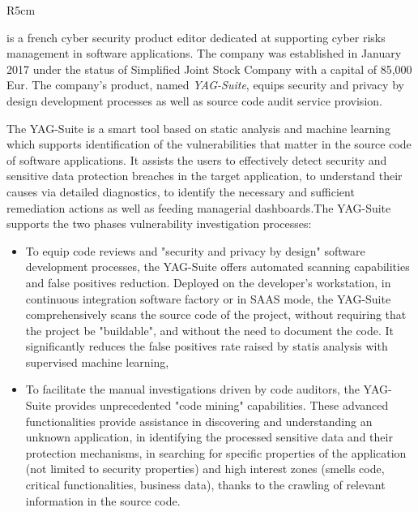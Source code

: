 \documentclass[a4paper,11pt]{article}
\begin{document}
\pagebreak
{}


\begin{wrapfigure}{R}{5cm}
\vspace{-1.3cm}
\hfill {}
\vspace{-0.8cm}
\end{wrapfigure}
\label{sec:participantYAG}

\YAGlong{} is a french cyber security product editor dedicated at supporting cyber risks management in software applications. The company was established in January 2017 under the status of Simplified Joint Stock Company with a capital of 85,000 Eur. The company's product, named \textit{YAG-Suite}, equips security and privacy by design development processes as well as source code audit service provision. 

The YAG-Suite is a smart tool based on static analysis and machine learning which supports identification of the vulnerabilities that matter in the source code of software applications. It assists the users to effectively detect security and sensitive data protection breaches in the target application, to understand their causes via detailed diagnostics, to identify the necessary and sufficient remediation actions as well as feeding managerial dashboards.The YAG-Suite supports the two phases vulnerability investigation processes:
\begin{itemize}
\item To equip code reviews and "security and privacy by design" software development processes, the YAG-Suite offers automated scanning capabilities and false positives reduction. Deployed on the developer's workstation, in continuous integration software factory or in SAAS mode, the YAG-Suite comprehensively scans the source code of the project, without requiring that the project be "buildable", and without the need to document the code. It significantly reduces the false positives rate raised by statis analysis with supervised machine learning,
\item To facilitate the manual investigations driven by code auditors, the YAG-Suite provides unprecedented "code mining" capabilities. These advanced functionalities provide assistance in discovering and understanding an unknown application, in identifying the processed sensitive data and their protection mechanisms, in searching for specific properties of the application (not limited to security properties) and high interest zones (smells code, critical functionalities, business data), thanks to the crawling of relevant information in the source code.
\end{itemize}
\end{document}
